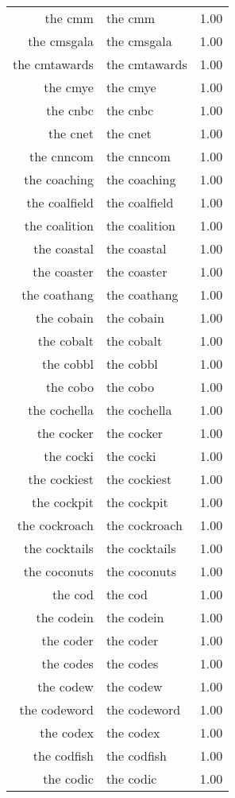 \begin{table}[ht]
\begin{tabular}{rlr}
  the cmm & the cmm & 1.00 \\ 
  the cmsgala & the cmsgala & 1.00 \\ 
  the cmtawards & the cmtawards & 1.00 \\ 
  the cmye & the cmye & 1.00 \\ 
  the cnbc & the cnbc & 1.00 \\ 
  the cnet & the cnet & 1.00 \\ 
  the cnncom & the cnncom & 1.00 \\ 
  the coaching & the coaching & 1.00 \\ 
  the coalfield & the coalfield & 1.00 \\ 
  the coalition & the coalition & 1.00 \\ 
  the coastal & the coastal & 1.00 \\ 
  the coaster & the coaster & 1.00 \\ 
  the coathang & the coathang & 1.00 \\ 
  the cobain & the cobain & 1.00 \\ 
  the cobalt & the cobalt & 1.00 \\ 
  the cobbl & the cobbl & 1.00 \\ 
  the cobo & the cobo & 1.00 \\ 
  the cochella & the cochella & 1.00 \\ 
  the cocker & the cocker & 1.00 \\ 
  the cocki & the cocki & 1.00 \\ 
  the cockiest & the cockiest & 1.00 \\ 
  the cockpit & the cockpit & 1.00 \\ 
  the cockroach & the cockroach & 1.00 \\ 
  the cocktails & the cocktails & 1.00 \\ 
  the coconuts & the coconuts & 1.00 \\ 
  the cod & the cod & 1.00 \\ 
  the codein & the codein & 1.00 \\ 
  the coder & the coder & 1.00 \\ 
  the codes & the codes & 1.00 \\ 
  the codew & the codew & 1.00 \\ 
  the codeword & the codeword & 1.00 \\ 
  the codex & the codex & 1.00 \\ 
  the codfish & the codfish & 1.00 \\ 
  the codic & the codic & 1.00 \\ 

\end{tabular}
\end{table}
